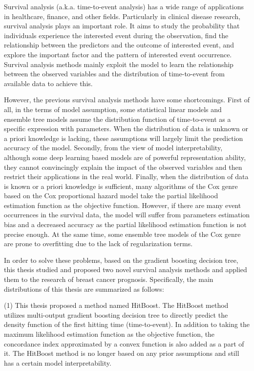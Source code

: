 
\begin{englishabstract}
    Survival analysis (a.k.a. time-to-event analysis) has a wide range of applications in healthcare, finance, and other fields. Particularly in clinical disease research, survival analysis plays an important role. It aims to study the probability that individuals experience the interested event during the observation, find the relationship between the predictors and the outcome of interested event, and explore the important factor and the pattern of interested event occurrence. Survival analysis methods mainly exploit the model to learn the relationship between the observed variables and the distribution of time-to-event from available data to achieve this.
	
	However, the previous survival analysis methods have some shortcomings. First of all, in the terms of model assumption, some statistical linear models and ensemble tree models assume the distribution function of time-to-event as a specific expression with parameters. When the distribution of data is unknown or a priori knowledge is lacking, these assumptions will largely limit the prediction accuracy of the model. Secondly, from the view of model interpretability, although some deep learning based models are of powerful representation ability, they cannot convincingly explain the impact of the observed variables and then restrict their applications in the real world. Finally, when the distribution of data is known or a priori knowledge is sufficient, many algorithms of the Cox genre based on the Cox proportional hazard model take the partial likelihood estimation function as the objective function. However, if there are many event occurrences in the survival data, the model will suffer from parameters estimation bias and a decreased accuracy as the partial likelihood estimation function is not precise enough. At the same time, some ensemble tree models of the Cox genre are prone to overfitting due to the lack of regularization terms.

    In order to solve these problems, based on the gradient boosting decision tree, this thesis studied and proposed two novel survival analysis methods and applied them to the research of breast cancer prognosis. Specifically, the main distributions of this thesis are summarized as follows:

    (1) This thesis proposed a method named HitBoost. The HitBoost method utilizes multi-output gradient boosting decision tree to directly predict the density function of the first hitting time (time-to-event). In addition to taking the maximum likelihood estimation function as the objective function, the concordance index approximated by a convex function is also added as a part of it. The HitBoost method is no longer based on any prior assumptions and still has a certain model interpretability.
    

\end{englishabstract}
